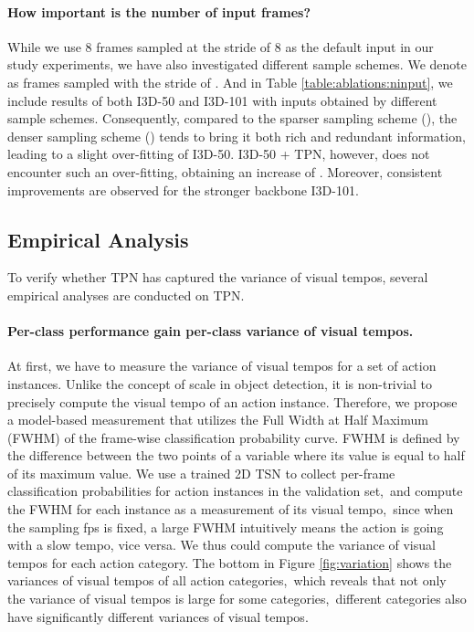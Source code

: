 \documentclass[10pt,twocolumn,letterpaper]{article}
\begin{document}
\paragraph{How important is the number of input frames?}
While we use 8 frames sampled at the stride of 8 as the default input in our study experiments, we have also investigated different sample schemes.
We denote  as  frames sampled with the stride of .
And in Table \ref{table:ablations:ninput}, we include results of both I3D-50 and I3D-101 with inputs obtained by different sample schemes.
Consequently, compared to the sparser sampling scheme (), the denser sampling scheme () tends to bring it both rich and redundant information, leading to a slight over-fitting of I3D-50.
I3D-50 + TPN, however, does not encounter such an over-fitting, obtaining an increase of .
Moreover, consistent improvements are observed for the stronger backbone I3D-101.


\subsection{Empirical Analysis}\label{subsec:verifcation}
To verify whether TPN has captured the variance of visual tempos,
several empirical analyses are conducted on TPN.


\paragraph{Per-class performance gain \vs per-class variance of visual tempos.}
At first, we have to measure the variance of visual tempos for a set of action instances.
Unlike the concept of scale in object detection, it is non-trivial to precisely compute the visual tempo of an action instance.
Therefore, we propose a model-based measurement that utilizes the Full Width at Half Maximum (FWHM) of the frame-wise classification probability curve.
FWHM is defined by the difference between the two points of a variable where its value is equal to half of its maximum value.
We use a trained 2D TSN to collect per-frame classification probabilities for action instances in the validation set,\
and compute the FWHM for each instance as a measurement of its visual tempo,\
since when the sampling fps is fixed, a large FWHM intuitively means the action is going with a slow tempo, vice versa.
We thus could compute the variance of visual tempos for each action category.
The bottom in Figure \ref{fig:variation} shows the variances of visual tempos of all action categories,\
which reveals that not only the variance of visual tempos is large for some categories,\ 
different categories also have significantly different variances of visual tempos.
\end{document}
